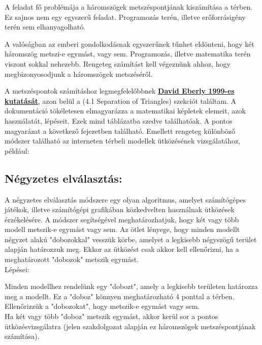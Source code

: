 
A feladat fő problémája a háromszögek metszéspontjának kiszámítása a térben. Ez sajnos nem egy egyszerű feladat. Programozás terén, illetve erőforrásigény terén sem elhanyagolható.

A valóságban az emberi gondolkodásnak egyszerűnek tűnhet eldönteni, hogy két háromszög metszi-e egymást, vagy sem. Programozás, illetve matematika terén viszont sokkal nehezebb. Rengeteg számítást kell végeznünk ahhoz, hogy megbizonyosodjunk a háromszögek metszéséről.

A metszéspontok számításhoz legmegfelelőbbnek \textbf{\href{https://www.geometrictools.com/Documentation/DynamicCollisionDetection.pdf}{David Eberly 1999-es kutatását}}, azon belül a \cite{triangles}(4.1 Separation of Triangles) szekciót találtam. A dokumentáció tökéletesen elmagyarázza a matematikai képletek elemeit, azok használatát, lépéseit. Ezek mind táblázatba szedve találhatóak. A pontos magyarázat a következő fejezetben található. Emellett rengeteg különböző módszer található az interneten térbeli modellek ütközésének vizsgálatához, például:\\
\newpage
\subsection{Négyzetes elválasztás:}
A négyzetes elválasztás módszere egy olyan algoritmus, amelyet számítógépes játékok, illetve számítógépi grafikában közkedvelten használnak ütközések érzékelésére.
A módszer segítségével meghatározhatjuk, hogy két vagy több modell metszik-e egymást vagy sem.
Az ötlet lényege, hogy minden modellt négyzet alakú "dobozokkal" vesszük körbe, amelyet a legkisebb négyszögű terület alapján határozzuk meg. Ekkor az ütközést csak akkor kell ellenőrizni, ha a meghatározott "dobozok" metszik egymást.\\
Lépései:

\textbullet Minden modellhez rendelünk egy "dobozt", amely a legkisebb területen határozza meg a modellt. Ez a "doboz" könnyen meghatározható 4 ponttal a térben.\\

\textbullet Ellenőrizzük a "dobozokat", hogy metszik-e egymást vagy sem.\\

\textbullet Ha két vagy több "doboz" metszik egymást, akkor kerül sor a pontos ütközésvizsgálatra (jelen szakdolgozat alapján ez háromszögek metszéspontjának számítása).\\

